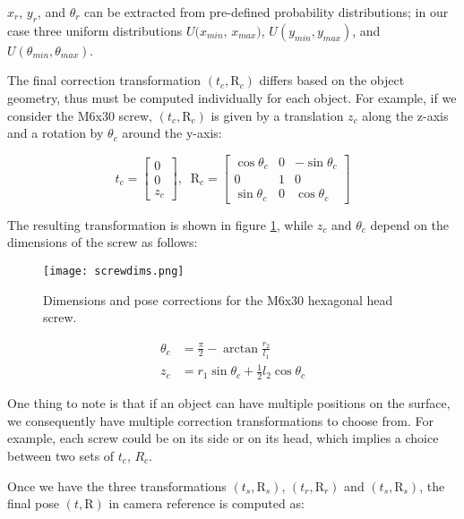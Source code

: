 $x_r$, $y_r$, and  $\theta_r$ can be extracted from pre-defined probability distributions; in our case three uniform distributions $U(x_{min}$, $x_{max})$, $U(y_{min}, y_{max})$, and $U(\theta_{min}, \theta_{max})$.

The final correction transformation $(t_c, \text{R}_c)$ differs based on the object geometry, thus must be computed individually for each object. For example, if we consider the M6x30 screw, $(t_c, \text{R}_c)$ is given by a translation $z_c$ along the z-axis and a rotation by $\theta_c$ around the y-axis:

\begin{equation*}
    t_c = 
    \begin{bmatrix}
        0\\0\\z_c
    \end{bmatrix}
    ,\; \; \text{R}_c =
    \begin{bmatrix}
        \cos \theta_c & 0 & -\sin \theta_c\\
        0 & 1 & 0\\
        \sin \theta_c & 0 &  \cos \theta_c
    \end{bmatrix}
\end{equation*}

The resulting transformation is shown in figure \ref*{fig:screwdim}, while $z_c$ and $\theta_c$ depend on the dimensions of the screw as follows:

\begin{figure}[ht]
    \texttt{[image: screwdims.png]}
    \caption{Dimensions and pose corrections for the M6x30 hexagonal head screw.}
    \label{fig:screwdim}
\end{figure}

\begin{align*}
    \theta_c &= \frac{\pi}{2} - \arctan \frac{r_2}{l_1}\\
    z_c &= r_1 \sin \theta_c + \frac{1}{2} l_2 \cos \theta_c
\end{align*}

One thing to note is that if an object can have multiple positions on the surface, we consequently have multiple correction transformations to choose from. For example, each screw could be on its side or on its head, which implies a choice between two sets of $t_c$, $R_c$.

Once we have the three transformations $(t_s, \text{R}_s)$, $(t_r, \text{R}_r)$ and $(t_s, \text{R}_s)$, the final pose $(t, \text{R})$ in camera reference is computed as:

